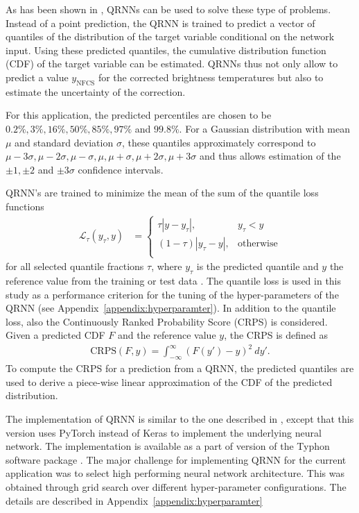 \documentclass[amt, manuscript]{copernicus}
\newcommand{\ynfcs}{y_\text{NFCS}}
\begin{document}
As has been shown in \citet{pfreundschuh:aneur:18}, QRNNs can be used to solve
these type of problems. Instead of a point prediction, the QRNN is trained to
predict a vector of quantiles of the distribution of the target variable
conditional on the network input. Using these predicted quantiles, the cumulative
distribution function (CDF) of the target variable can be estimated. QRNNs thus
not only allow to predict a value $\ynfcs$ for the corrected brightness temperatures
but also to estimate the uncertainty of the correction.

For this application, the predicted percentiles are chosen to be
$0.2\%, 3\%, 16\%, 50\%, 85\%, 97\%$ and $99.8\%$. For a Gaussian
distribution with mean $\mu$ and standard deviation $\sigma$, these quantiles
approximately correspond to $\mu -3\sigma, \mu-2\sigma, \mu-\sigma
, \mu, \mu + \sigma, \mu + 2\sigma, \mu + 3\sigma$ and thus allows
estimation of the $\pm 1, \pm 2$ and $\pm 3\sigma$ confidence intervals.

QRNN's are trained to minimize the mean of the sum of the quantile loss functions
%
\begin{align}
\mathcal{L}_\tau(y_\tau, y) &=
\begin{cases}
\tau|y - y_\tau|, & y_\tau < y \\ (1 - \tau)|y_\tau - y|, & \text{otherwise}
\\
\end{cases}
\end{align}
%
for all selected quantile fractions $\tau$, where $y_\tau$ is the predicted
quantile and $y$ the reference value from the training or test data . The
quantile loss is used in this study as a performance criterion for the tuning of
the hyper-parameters of the QRNN (see Appendix~\ref{appendix:hyperparamter}). In
addition to the quantile loss, also the Continuously Ranked Probability Score
(CRPS) is considered. Given a predicted CDF
$F$ and the reference value $y$, the CRPS is defined as
%
\begin{align}
\text{CRPS}(F, y) = \int_{-\infty}^{\infty} \left (F(y') - y\right )^2\: dy'.
\end{align}
%
To compute the CRPS for a prediction from a QRNN, the predicted quantiles are
used to derive a piece-wise linear approximation of the CDF of the predicted
distribution.

The implementation of QRNN is similar to the one described in
\citet{pfreundschuh:aneur:18}, except that this version uses PyTorch
\citep{paszke2017automatic} instead of Keras \citep{chollet2015keras} to
implement the underlying neural network. The implementation is available as a
part of version of the Typhon software package \citep{typhonv08}. The major
challenge for implementing QRNN for the current application was to select high
performing neural network architecture. This was obtained through grid search
over different hyper-parameter configurations. The details are described in
Appendix~\ref{appendix:hyperparamter}
\end{document}
